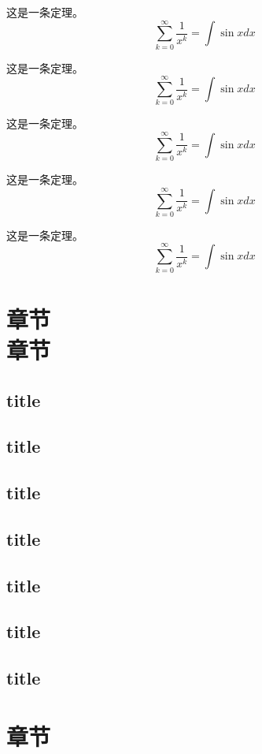 \documentclass[twoside]{fduthesis}
\begin{document}
\begin{nmb}
这是一条定理。
\[ \sum_{k=0}^{\infty} \frac{1}{x^k} = \int \sin x dx \]
\end{nmb}

\begin{ncb}
这是一条定理。
\[ \sum_{k=0}^{\infty} \frac{1}{x^k} = \int \sin x dx \]
\end{ncb}

\begin{ncb}
这是一条定理。
\[ \sum_{k=0}^{\infty} \frac{1}{x^k} = \int \sin x dx \]
\end{ncb}

\begin{ncb}
这是一条定理。
\[ \sum_{k=0}^{\infty} \frac{1}{x^k} = \int \sin x dx \]
\end{ncb}

\begin{ncb}
这是一条定理。
\[ \sum_{k=0}^{\infty} \frac{1}{x^k} = \int \sin x dx \]
\end{ncb}

\chapter{章节 \\ 章节}
\section{title}
\section{title}
\section{title}
\section{title}
\section{title}
\section{title}
\section{title}
\chapter{章节}
\end{document}
